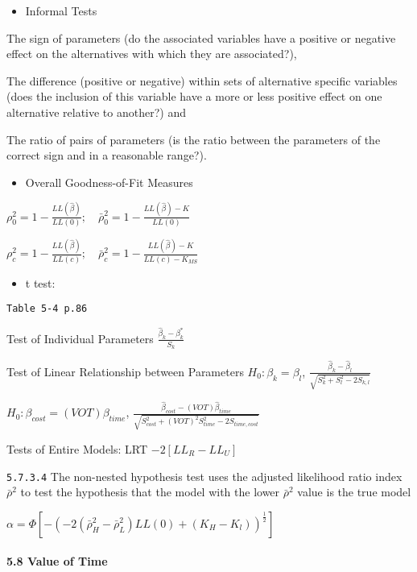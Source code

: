 \documentclass[
]{article}
\providecommand{\tightlist}{%
  \setlength{\itemsep}{0pt}\setlength{\parskip}{0pt}}
\begin{document}
\begin{itemize}
\tightlist
\item
  Informal Tests
\end{itemize}

The sign of parameters (do the associated variables have a positive or
negative effect on the alternatives with which they are associated?),

The difference (positive or negative) within sets of alternative
specific variables (does the inclusion of this variable have a more or
less positive effect on one alternative relative to another?) and

The ratio of pairs of parameters (is the ratio between the parameters of
the correct sign and in a reasonable range?).

\begin{itemize}
\tightlist
\item
  Overall Goodness-of-Fit Measures
\end{itemize}

\(\rho_0^2=1-\frac{LL(\hat\beta)}{LL(0)};\quad\bar\rho_0^2=1-\frac{LL(\hat\beta)-K}{LL(0)}\)

\(\rho_c^2=1-\frac{LL(\hat\beta)}{LL(c)};\quad\bar\rho_c^2=1-\frac{LL(\hat\beta)-K}{LL(c)-K_{MS}}\)

\begin{itemize}
\tightlist
\item
  t test:
\end{itemize}

\texttt{Table\ 5-4\ p.86}

Test of Individual Parameters \(\frac{\hat\beta_k-\beta^*_k}{S_k}\)

Test of Linear Relationship between Parameters \(H_0:\beta_k=\beta_l\),
\(\frac{\hat\beta_k-\hat\beta_l}{\sqrt{S_k^2+S_l^2-2S_{k,l}}}\)

\(H_0:\beta_{cost}=(VOT)\beta_{time}\),
\(\frac{\hat\beta_{cost}-(VOT)\hat\beta_{time}}{\sqrt{S_{cost}^2+(VOT)^2S^2_{time}-2S_{time,cost}}}\)

Tests of Entire Models: LRT \(-2[LL_{R}-LL_U]\)

\texttt{5.7.3.4} The non-nested hypothesis test uses the adjusted
likelihood ratio index \(\bar\rho^2\) to test the hypothesis that the
model with the lower \(\bar\rho^2\) value is the true model

\(\alpha=\Phi[-(-2(\bar\rho^2_H-\bar\rho^2_L)LL(0)+(K_H-K_l))^{\frac12}]\)

\hypertarget{value-of-time}{%
\paragraph{5.8 Value of Time}\label{value-of-time}}
\end{document}
